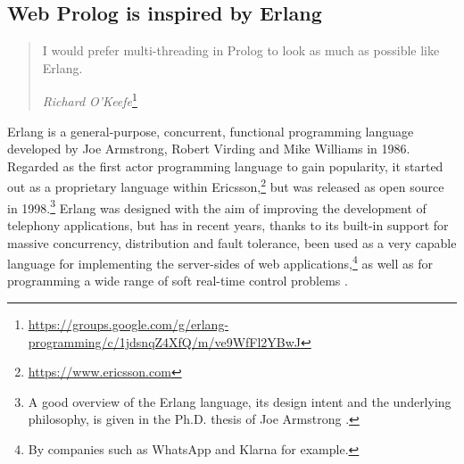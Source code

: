 %
%
%


\subsection{Web Prolog is inspired by Erlang}\label{sec:erlang-inspiration}
\vspace{-0.5cm}
\begin{quotation}
\flushright I would prefer multi-threading in Prolog to look as much as possible like Erlang.

\flushright\textit{Richard O'Keefe}\footnote{\url{https://groups.google.com/g/erlang-programming/c/1jdsnqZ4XfQ/m/ve9WfFl2YBwJ}}
\end{quotation}

\noindent Erlang is a general-purpose, concurrent, functional programming language developed by Joe Armstrong, Robert Virding and Mike Williams in 1986. Regarded as the first actor programming language to gain popularity, it started out as a proprietary language within Ericsson,\footnote{\url{https://www.ericsson.com}} but was released as open source in 1998.\footnote{A good overview of the Erlang language, its design intent and the underlying philosophy, is given in the Ph.D. thesis of Joe Armstrong \cite{Armstrong2003}.} Erlang was designed with the aim of improving the development of telephony applications, but has in recent years, thanks to its built-in support for massive concurrency, distribution and fault tolerance, been used as a very capable language for implementing the server-sides of web applications,\footnote{By companies such as WhatsApp and Klarna for example.} as well as for programming a wide range of soft real-time control problems \cite{10.5555/229883}.

